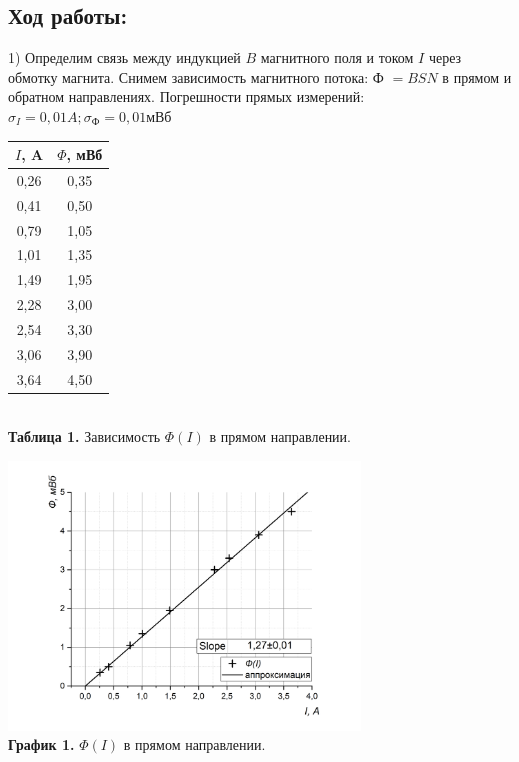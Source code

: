 \documentclass{article}
\begin{document}
\subsection* {Ход работы:}
1) Определим связь между индукцией \(B\) магнитного поля и током \(I\) через обмотку магнита. Снимем зависимость магнитного потока: Ф \(= BSN\) в прямом и обратном направлениях. Погрешности прямых измерений: \(\sigma_{I} = 0,01 A; \sigma_{\text{Ф}} = 0,01 \text{мВб}\)

\begin{center}
\begin{tabular}{|c|c|}
    \hline
    $I$, A & $\Phi$, мВб \\ \hline
    0,26 & 0,35 \\ \hline
    0,41 & 0,50 \\ \hline
    0,79 & 1,05 \\ \hline
    1,01 & 1,35 \\ \hline
    1,49 & 1,95 \\ \hline
    2,28 & 3,00 \\ \hline
    2,54 & 3,30 \\ \hline
    3,06 & 3,90 \\ \hline
    3,64 & 4,50 \\ \hline
\end{tabular}\\
  \textbf{Таблица 1.} Зависимость $\Phi (I)$ в прямом направлении.\\
  \end{center}

\begin{center}
    \includegraphics[width = 0.7\textwidth]{images/image2.png}\\
    \textbf{График 1.} $\Phi (I)$ в прямом направлении.
\end{center}
  
\end{document}
